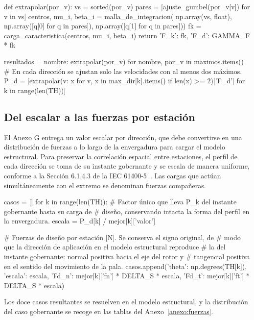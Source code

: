 \begin{pycode}
def extrapolar(por_v):
    vs    = sorted(por_v)
    pares = [ajuste_gumbel(por_v[v]) for v in vs]
    centros, mu_i, beta_i = malla_de_integracion(
        np.array(vs, float),
        np.array([q[0] for q in pares]),
        np.array([q[1] for q in pares]))
    fk = carga_caracteristica(centros, mu_i, beta_i)
    return {'F_k': fk, 'F_d': GAMMA_F * fk}


resultados = {nombre: extrapolar(por_v) for nombre, por_v in maximos.items()}
# En cada dirección se ajustan solo las velocidades con al menos dos máximos.
P_d = [extrapolar({v: x for v, x in max_dir[k].items() if len(x) >= 2})['F_d']
       for k in range(len(TH))]
\end{pycode}

\subsection*{Del escalar a las fuerzas por estación}

El Anexo G entrega un valor escalar por dirección, que debe convertirse en una distribución de fuerzas a lo largo de la envergadura para cargar el modelo estructural. Para preservar la correlación espacial entre estaciones, el perfil de cada dirección se toma de su instante gobernante y se escala de manera uniforme, conforme a la Sección 6.1.4.3 de la IEC 61400-5~\parencite*{IEC61400-5}. Las cargas que actúan simultáneamente con el extremo se denominan fuerzas compañeras.

\begin{pycode}
casos = []
for k in range(len(TH)):
    # Factor único que lleva P_k del instante gobernante hasta su carga de
    # diseño, conservando intacta la forma del perfil en la envergadura.
    escala = P_d[k] / mejor[k]['valor']

    # Fuerzas de diseño por estación [N]. Se conserva el signo original, de
    # modo que la dirección de aplicación en el modelo estructural reproduce
    # la del instante gobernante: normal positiva hacia el eje del rotor y
    # tangencial positiva en el sentido del movimiento de la pala.
    casos.append({'theta': np.degrees(TH[k]), 'escala': escala,
                  'Fd_n': mejor[k]['fn'] * DELTA_S * escala,
                  'Fd_t': mejor[k]['ft'] * DELTA_S * escala})
\end{pycode}

Los doce casos resultantes se resuelven en el modelo estructural, y la distribución del caso gobernante se recoge en las tablas del Anexo~\ref{anexo:fuerzas}.
